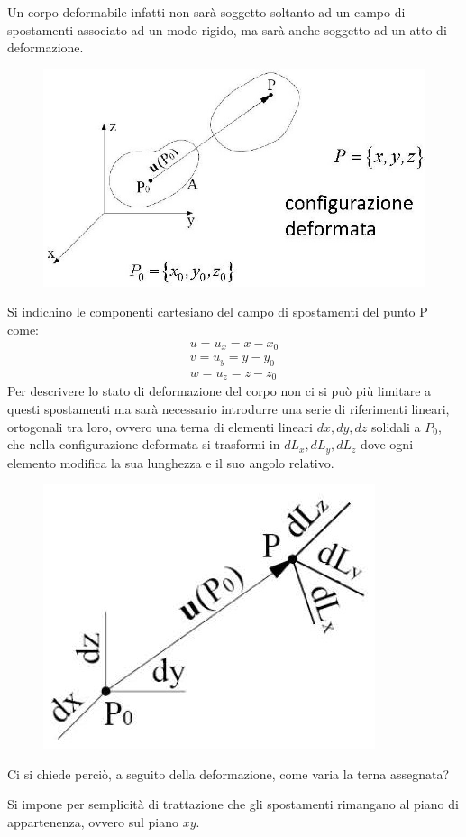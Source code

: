 \documentclass{article}
\begin{document}
\begin{adjustwidth}{2in}{}
	Un corpo deformabile infatti non sarà soggetto soltanto ad un campo di spostamenti associato ad un modo rigido, ma sarà anche soggetto ad un atto di deformazione. 
\begin{figure}[H]
	\centering
	\includegraphics[width=0.4\linewidth]{immagini/1.PARTE7_Pagina_22 (2)}
\end{figure}
	Si indichino le componenti cartesiano del campo di spostamenti del punto P come:
	\[
	\begin{array}{c}
		u = u_x = x - x_0 \\
		v = u_y = y - y_0 \\
		w = u_z = z - z_0
	\end{array}
	\]
		Per descrivere lo stato di deformazione del corpo non ci si può più limitare a questi spostamenti ma sarà necessario introdurre una serie di riferimenti lineari, ortogonali tra loro, ovvero una terna di elementi lineari $dx, dy, dz$ solidali a $P_0$, che nella configurazione deformata si trasformi in $dL_x, dL_y, dL_z$ dove ogni elemento modifica la sua lunghezza e il suo angolo relativo.
\begin{figure}[H]
	\centering
	\includegraphics[width=0.25\linewidth]{immagini/1.PARTE7_Pagina_22}
\end{figure}
	Ci si chiede perciò, a seguito della deformazione, come varia la terna assegnata? \newline 
	
	Si impone per semplicità di trattazione che gli spostamenti rimangano al piano di appartenenza, ovvero sul piano $xy$.
	

\end{adjustwidth}
\end{document}
